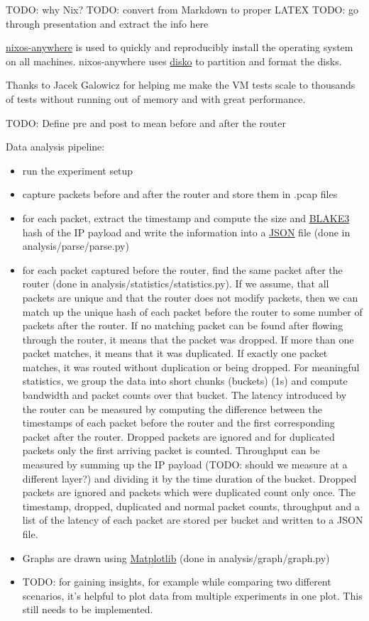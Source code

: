 TODO: why Nix?
TODO: convert from Markdown to proper LATEX
TODO: go through presentation and extract the info here

\href{https://github.com/nix-community/nixos-anywhere}{nixos-anywhere} is used to quickly and reproducibly install the operating system on all machines.
nixos-anywhere uses \href{https://github.com/nix-community/disko}{disko} to partition and format the disks.


Thanks to Jacek Galowicz for helping me make the VM tests scale to thousands of tests without running out of memory and with great performance.

TODO: Define pre and post to mean before and after the router

Data analysis pipeline:
\begin{itemize}
  \item run the experiment setup
  \item capture packets before and after the router and store them in .pcap files
  \item for each packet, extract the timestamp and compute the size and \href{https://en.wikipedia.org/wiki/BLAKE_(hash_function)#BLAKE3}{BLAKE3} hash of the IP payload and write the information into a \href{https://en.wikipedia.org/wiki/JSON}{JSON} file (done in analysis/parse/parse.py)
  \item for each packet captured before the router, find the same packet after the router (done in analysis/statistics/statistics.py). If we assume, that all packets are unique and that the router does not modify packets, then we can match up the unique hash of each packet before the router to some number of packets after the router. If no matching packet can be found after flowing through the router, it means that the packet was dropped. If more than one packet matches, it means that it was duplicated. If exactly one packet matches, it was routed without duplication or being dropped. For meaningful statistics, we group the data into short chunks (buckets) (1s) and compute bandwidth and packet counts over that bucket. The latency introduced by the router can be measured by computing the difference between the timestamps of each packet before the router and the first corresponding packet after the router. Dropped packets are ignored and for duplicated packets only the first arriving packet is counted. Throughput can be measured by summing up the IP payload (TODO: should we measure at a different layer?) and dividing it by the time duration of the bucket. Dropped packets are ignored and packets which were duplicated count only once. The timestamp, dropped, duplicated and normal packet counts, throughput and a list of the latency of each packet are stored per bucket and written to a JSON file.
  \item Graphs are drawn using \href{https://matplotlib.org/}{Matplotlib} (done in analysis/graph/graph.py)
  \item TODO: for gaining insights, for example while comparing two different scenarios, it's helpful to plot data from multiple experiments in one plot. This still needs to be implemented.
\end{itemize}


